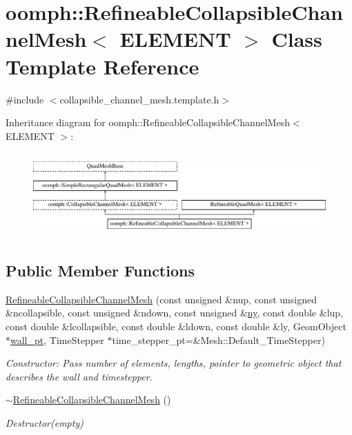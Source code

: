\hypertarget{classoomph_1_1RefineableCollapsibleChannelMesh}{}\section{oomph\+:\+:Refineable\+Collapsible\+Channel\+Mesh$<$ E\+L\+E\+M\+E\+NT $>$ Class Template Reference}
\label{classoomph_1_1RefineableCollapsibleChannelMesh}


{\ttfamily \#include $<$collapsible\+\_\+channel\+\_\+mesh.\+template.\+h$>$}

Inheritance diagram for oomph\+:\+:Refineable\+Collapsible\+Channel\+Mesh$<$ E\+L\+E\+M\+E\+NT $>$\+:\begin{figure}[H]
\begin{center}
\leavevmode
\includegraphics[height=3.246377cm]{classoomph_1_1RefineableCollapsibleChannelMesh}
\end{center}
\end{figure}
\subsection*{Public Member Functions}
\begin{DoxyCompactItemize}
\item 
\hyperlink{classoomph_1_1RefineableCollapsibleChannelMesh_a0abc3741a7b74dd543096fb303b96243}{Refineable\+Collapsible\+Channel\+Mesh} (const unsigned \&nup, const unsigned \&ncollapsible, const unsigned \&ndown, const unsigned \&\hyperlink{classoomph_1_1SimpleRectangularQuadMesh_a45011f22dedd480392b1f376e4269921}{ny}, const double \&lup, const double \&lcollapsible, const double \&ldown, const double \&ly, Geom\+Object $\ast$\hyperlink{classoomph_1_1CollapsibleChannelMesh_a04ffeb61678763dfd250962ea9ba614b}{wall\+\_\+pt}, Time\+Stepper $\ast$time\+\_\+stepper\+\_\+pt=\&Mesh\+::\+Default\+\_\+\+Time\+Stepper)
\begin{DoxyCompactList}\small\item\em Constructor\+: Pass number of elements, lengths, pointer to geometric object that describes the wall and timestepper. \end{DoxyCompactList}\item 
\hyperlink{classoomph_1_1RefineableCollapsibleChannelMesh_ae429201cc0fe53f5abf96b7d9564df65}{$\sim$\+Refineable\+Collapsible\+Channel\+Mesh} ()
\begin{DoxyCompactList}\small\item\em Destructor(empty) \end{DoxyCompactList}\end{DoxyCompactItemize}
